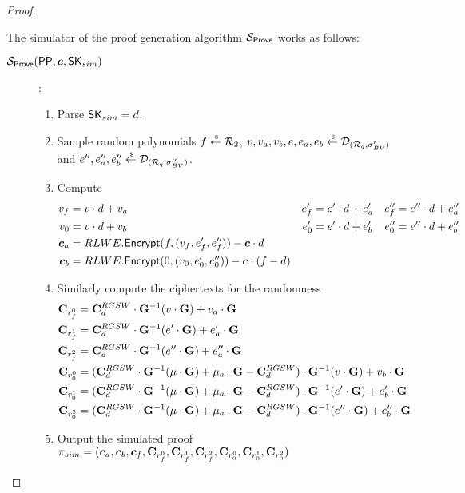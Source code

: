 \begin{proof}
\begin{description}
    The simulator of the proof generation algorithm $\mathcal{S}_{{\mathsf{Prove}}}$ works as follows:
    \begin{description}
    \item[$\mathcal{S}_{\Prove}(\PPP, \vec{c}, \SK_{sim})$]:
      \begin{enumerate}
      \item Parse $\mathsf{SK}_{sim} = d$.
      \item Sample random polynomials $f \stackrel{{\scriptscriptstyle \mkern4mu \$}}{\gets} {\mathcal{R}}_2$, $v,v_a, v_b, e, e_a, e_b \stackrel{{\scriptscriptstyle \mkern4mu \$}}{\gets} \mathcal{D}_{({\mathcal{R}}_q, \sigma_{BV}')}$ and $e'', e_a'', e_b'' \stackrel{{\scriptscriptstyle \mkern4mu \$}}{\gets} \mathcal{D}_{({\mathcal{R}}_q, \sigma_{BV}'')}$.
      \item Compute
        \begin{align*}
          v_f &= v \cdot d + v_a & e_f' &= e' \cdot d + e_a' & e_f'' &= e'' \cdot d + e_a''\\
          v_0 &= v \cdot d + v_b & e_0' &= e' \cdot d + e_b' & e_0'' &= e'' \cdot d + e_b''\\
          \vec{c}_a &= RLWE.\Enc(f, (v_f, e_f', e_f'')) - \vec{c} \cdot d \\
          \vec{c}_b &= RLWE.\Enc(0, (v_0, e_0', e_0'')) - \vec{c} \cdot (f - d)
        \end{align*}
      \item Similarly compute the ciphertexts for the randomness
        \begin{align*}
          \mathbf{C}_{r_f^0} &= \mathbf{C}_d^{RGSW} \cdot \mathbf{G}^{-1}(v \cdot \mathbf{G}) + v_a \cdot \mathbf{G} \\
          \mathbf{C}_{r_f^1} &= \mathbf{C}_d^{RGSW} \cdot \mathbf{G}^{-1}(e' \cdot \mathbf{G}) + e_a' \cdot \mathbf{G} \\
          \mathbf{C}_{r_f^2} &= \mathbf{C}_d^{RGSW} \cdot \mathbf{G}^{-1}(e'' \cdot \mathbf{G}) + e_a'' \cdot \mathbf{G} \\
          \mathbf{C}_{r_0^0} &= (\mathbf{C}_d^{RGSW} \cdot \mathbf{G}^{-1}(\mu \cdot \mathbf{G}) + \mu_a \cdot \mathbf{G} - \mathbf{C}_d^{RGSW}) \cdot \mathbf{G}^{-1}(v \cdot \mathbf{G}) + v_b \cdot \mathbf{G} \\
          \mathbf{C}_{r_0^1} &= (\mathbf{C}_d^{RGSW} \cdot \mathbf{G}^{-1}(\mu \cdot \mathbf{G}) + \mu_a \cdot \mathbf{G} - \mathbf{C}_d^{RGSW}) \cdot \mathbf{G}^{-1}(e' \cdot \mathbf{G}) + e_b' \cdot \mathbf{G} \\
          \mathbf{C}_{r_0^2} &= (\mathbf{C}_d^{RGSW} \cdot \mathbf{G}^{-1}(\mu \cdot \mathbf{G}) + \mu_a \cdot \mathbf{G} - \mathbf{C}_d^{RGSW}) \cdot \mathbf{G}^{-1}(e'' \cdot \mathbf{G}) + e_b'' \cdot \mathbf{G}
        \end{align*}
      \item Output the simulated proof $\pi_{sim} = (\vec{c}_a, \vec{c}_b, \vec{c}_f, \mat{C}_{r_f^0}, \mat{C}_{r_f^1}, \mat{C}_{r_f^2}, \mat{C}_{r_0^0}, \mat{C}_{r_0^1}, \mat{C}_{r_0^2})$
      \end{enumerate}
    \end{description}


\end{description}
\end{proof}
